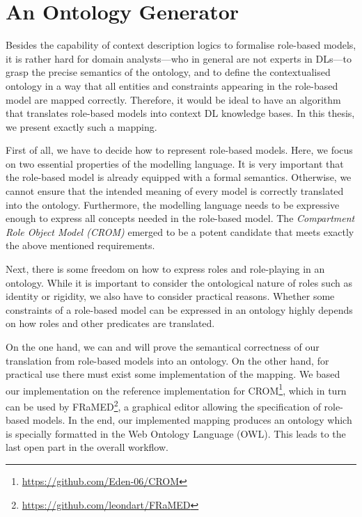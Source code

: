 \section{An Ontology Generator}
\label{sec:zweite-section}

Besides the capability of context description logics to formalise role-based models, it is rather
hard for domain analysts---who in general are not experts in DLs---to grasp the precise
semantics of the ontology, and to define the contextualised ontology in a way that all entities and
constraints appearing in the role-based model are mapped correctly. Therefore, it would be ideal to
have an algorithm that translates role-based models into context DL knowledge bases.  In this thesis, we
present exactly such a mapping.

First of all, we have to decide how to represent role-based models. Here, we focus on two essential
properties of the modelling language. It is very important that the role-based model is already
equipped with a formal semantics. Otherwise, we cannot ensure that the intended meaning of every
model is correctly translated into the ontology. Furthermore, the modelling language needs to be
expressive enough to express all concepts needed in the role-based model.
%
The \emph{Compartment Role Object Model (CROM)}\cite{KuLG-SLE14,KBG-SLE15} emerged to be a potent
candidate that meets exactly the above mentioned requirements.

Next, there is some freedom on how to express roles and role-playing in an ontology. While it is
important to consider the ontological nature of roles such as identity or rigidity, we also have to
consider practical reasons. Whether some constraints of a role-based model can be expressed in an ontology
highly depends on how roles and other predicates are translated.

On the one hand, we can and will prove the semantical correctness of our translation from role-based
models into an \LMLO ontology. On the other hand, for practical use there must exist some
implementation of the mapping. We based our implementation on the reference implementation for
CROM\footnote{\url{https://github.com/Eden-06/CROM}}, which in turn can be used by
FRaMED\footnote{\url{https://github.com/leondart/FRaMED}}, a graphical editor allowing the
specification of role-based models. In the end, our implemented mapping produces an ontology which
is specially formatted in the Web Ontology Language (OWL).  This leads to the last open part in the
overall workflow.


